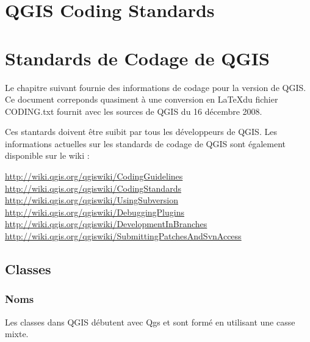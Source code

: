 
\section{QGIS Coding Standards}
\section{Standards de Codage de QGIS}


Le chapitre suivant fournie des informations de codage pour la version \CURRENT de QGIS.
Ce document correponds quasiment à une conversion en \LaTeX du fichier CODING.txt fournit 
avec les sources de QGIS du 16 décembre 2008.

Ces stantards doivent être suibit par tous les développeurs de QGIS. Les informations actuelles
sur les standards de codage de QGIS sont également disponible sur le wiki :

\url{http://wiki.qgis.org/qgiswiki/CodingGuidelines} \\
\url{http://wiki.qgis.org/qgiswiki/CodingStandards} \\
\url{http://wiki.qgis.org/qgiswiki/UsingSubversion} \\
\url{http://wiki.qgis.org/qgiswiki/DebuggingPlugins} \\
\url{http://wiki.qgis.org/qgiswiki/DevelopmentInBranches} \\
\url{http://wiki.qgis.org/qgiswiki/SubmittingPatchesAndSvnAccess} \\

\subsection{Classes}
\subsubsection{Noms}
Les classes dans QGIS débutent avec Qgs et sont formé en utilisant une casse mixte.

